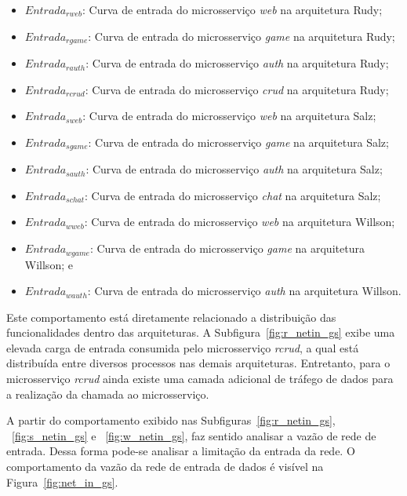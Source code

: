 \begin{itemize}
 \item $Entrada_{rweb}$: Curva de entrada do microsserviço \textit{web} na arquitetura Rudy;
 \item $Entrada_{rgame}$: Curva de entrada do microsserviço \textit{game} na arquitetura Rudy;
 \item $Entrada_{rauth}$: Curva de entrada do microsserviço \textit{auth} na arquitetura Rudy;
 \item $Entrada_{rcrud}$: Curva de entrada do microsserviço \textit{crud} na arquitetura Rudy;
  \item $Entrada_{sweb}$: Curva de entrada do microsserviço \textit{web} na arquitetura Salz;
 \item $Entrada_{sgame}$: Curva de entrada do microsserviço \textit{game} na arquitetura Salz;
 \item $Entrada_{sauth}$: Curva de entrada do microsserviço \textit{auth} na arquitetura Salz;
 \item $Entrada_{schat}$: Curva de entrada do microsserviço \textit{chat} na arquitetura Salz;
 \item $Entrada_{wweb}$: Curva de entrada do microsserviço \textit{web} na arquitetura Willson;
 \item $Entrada_{wgame}$: Curva de entrada do microsserviço \textit{game} na arquitetura Willson; e
 \item $Entrada_{wauth}$: Curva de entrada do microsserviço \textit{auth} na arquitetura Willson.
\end{itemize}


Este comportamento está diretamente relacionado a distribuição das funcionalidades dentro das arquiteturas.
%
A Subfigura~\ref{fig:r_netin_gs} exibe uma elevada carga de entrada consumida pelo microsserviço \textit{rcrud}, a qual está distribuída entre diversos processos nas demais arquiteturas.
%
Entretanto, para o microsserviço \textit{rcrud} ainda existe uma camada adicional de tráfego de dados para a realização da chamada ao microsserviço.

A partir do comportamento exibido nas Subfiguras~\ref{fig:r_netin_gs}, ~\ref{fig:s_netin_gs} e ~\ref{fig:w_netin_gs}, faz sentido analisar a vazão de rede de entrada.
%
Dessa forma pode-se analisar a limitação da entrada da rede.
%
O comportamento da vazão da rede de entrada de dados é visível na Figura~\ref{fig:net_in_gs}.

